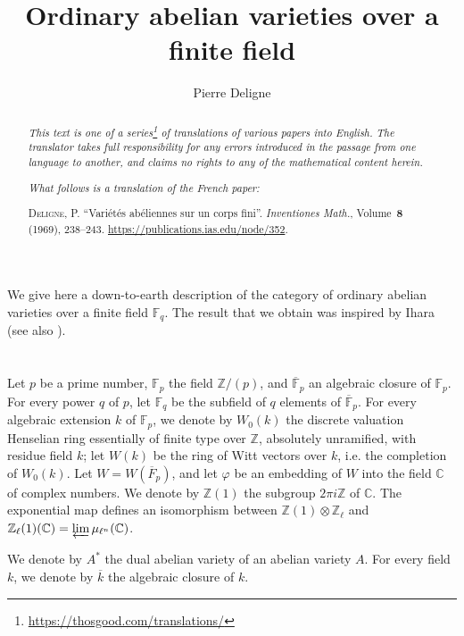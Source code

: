 \documentclass{article}
\title{Ordinary abelian varieties over a finite field}
\author{Pierre Deligne}
\newcommand{\FF}{\mathbb{F}}
\newcommand{\ZZ}{\mathbb{Z}}
\newcommand{\CC}{\mathbb{C}}
\newcommand{\oldpage}[1]{\marginpar{\footnotesize$\Big\vert$ \textit{p.~#1}}}
\begin{document}
\maketitle
\thispagestyle{fancy}

\renewcommand{\abstractname}{Translator's note.}

\begin{abstract}
  \renewcommand*{\thefootnote}{\fnsymbol{footnote}}
  \emph{This text is one of a series\footnote{\url{https://thosgood.com/translations/}} of translations of various papers into English.}
  \emph{The translator takes full responsibility for any errors introduced in the passage from one language to another, and claims no rights to any of the mathematical content herein.}
  
  \emph{What follows is a translation of the French paper:}

  \medskip\noindent
  \textsc{Deligne, P.}
  ``Vari\'{e}t\'{e}s ab\'{e}liennes sur un corps fini''.
  \emph{Inventiones Math.}, Volume~\textbf{8} (1969), 238--243.
  {\url{https://publications.ias.edu/node/352}}.
\end{abstract}

\setcounter{footnote}{0}



\oldpage{238}
We give here a down-to-earth description of the category of ordinary abelian varieties over a finite field $\FF_q$.
The result that we obtain was inspired by Ihara~\cite[ch.~V]{2} (see also \cite{3}).


\section{}
\label{1}
Let $p$ be a prime number, $\FF_p$ the field $\ZZ/(p)$, and $\overline{\FF}_p$ an algebraic closure of $\FF_p$.
For every power $q$ of $p$, let $\FF_q$ be the subfield of $q$ elements of $\overline{\FF}_p$.
For every algebraic extension $k$ of $\FF_p$, we denote by $W_0(k)$ the discrete valuation Henselian ring essentially of finite type over $\ZZ$, absolutely unramified, with residue field $k$;
let $W(k)$ be the ring of Witt vectors over $k$, i.e. the completion of $W_0(k)$.
Let $W=W(\overline{F}_p)$, and let $\varphi$ be an embedding of $W$ into the field $\CC$ of complex numbers.
We denote by $\ZZ(1)$ the subgroup $2\pi i\ZZ$ of $\CC$.
The exponential map defines an isomorphism between $\ZZ(1)\otimes\ZZ_\ell$ and $\ZZ_\ell(1)(\CC)=\varprojlim\mu_{\ell^n}(\CC)$.

We denote by $A^*$ the dual abelian variety of an abelian variety $A$.
For every field $k$, we denote by $\overline{k}$ the algebraic closure of $k$.
\end{document}
